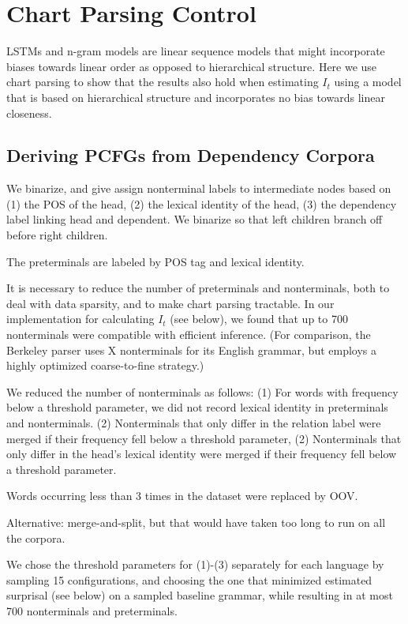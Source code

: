 \documentclass[11pt,letterpaper]{article}
\begin{document}
\section{Chart Parsing Control}

LSTMs and n-gram models are linear sequence models that might incorporate biases towards linear order as opposed to hierarchical structure.
Here we use chart parsing to show that the results also hold when estimating $I_t$ using a model that is based on hierarchical structure and incorporates no bias towards linear closeness.

\subsection{Deriving PCFGs from Dependency Corpora}



We binarize, and give assign nonterminal labels to intermediate nodes based on (1) the POS of the head, (2) the lexical identity of the head, (3) the dependency label linking head and dependent.
We binarize so that left children branch off before right children.

The preterminals are labeled by POS tag and lexical identity.

It is necessary to reduce the number of preterminals and nonterminals, both to deal with data sparsity, and to make chart parsing tractable.
In our implementation for calculating $I_t$ (see below), we found that up to 700 nonterminals were compatible with efficient inference.
(For comparison, the Berkeley parser uses X nonterminals for its English grammar, but employs a highly optimized coarse-to-fine strategy.)

We reduced the number of nonterminals as follows:
(1) For words with frequency below a threshold parameter, we did not record lexical identity in preterminals and nonterminals.
(2) Nonterminals that only differ in the relation label were merged if their frequency fell below a threshold parameter,
(2) Nonterminals that only differ in the head's lexical identity were merged if their frequency fell below a threshold parameter.

Words occurring less than 3 times in the dataset were replaced by OOV.

Alternative: merge-and-split, but that would have taken too long to run on all the corpora.

We chose the threshold parameters for (1)-(3) separately for each language by sampling 15 configurations, and choosing the one that minimized estimated surprisal (see below) on a sampled baseline grammar, while resulting in at most 700 nonterminals and preterminals.
\end{document}
